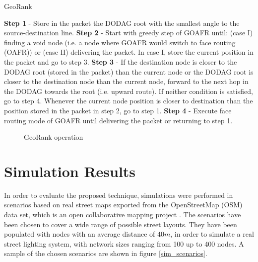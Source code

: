 \documentclass[authoryear,preprint,review,12pt]{elsarticle}
\begin{document}
\small
\begin{algorithm}
\begin{algorithmic}
\caption{GeoRank}
\label{alg}
\small
\STATE \textbf{Step 1} - Store in the packet the DODAG root with the smallest angle to the source-destination
line. 
\STATE \textbf{Step 2} - Start with greedy step of GOAFR until: (case I) finding a void node (i.e. a node where GOAFR would switch to face  routing (OAFR)) or (case II) delivering the packet. In case I, store the current position in the packet and go to step 3.
\STATE \textbf{Step 3} - If the destination node is closer to the DODAG root (stored in the packet) than the current node or the DODAG root is closer to the destination node than the current node, forward to the next hop in the DODAG towards the root (i.e. upward route). If neither condition is satisfied, go to step 4. Whenever the current node position is closer to destination than the position stored in the packet in step 2, go to step 1.
\STATE \textbf{Step 4} -  Execute face routing mode of GOAFR until delivering the packet or returning to step 1.
\small
\end{algorithmic}
\end{algorithm}
\normalsize
\begin{figure}
\centering
{}
\caption{GeoRank operation}
\label{state_machine}
\end{figure}

\section{Simulation Results}
\label{secSimulation}

In order to evaluate the proposed technique, simulations were performed in scenarios based on real street maps exported from the OpenStreetMap (OSM) data set, which is an open collaborative mapping project \citep{OSM}. The scenarios have been chosen to cover a wide range of possible street layouts. They have been populated with nodes with an average distance of $40m$, in order to simulate a real street lighting system, with network sizes ranging from 100 up to 400 nodes. A sample of the chosen scenarios are shown in figure \ref{sim_scenarios}. 
\end{document}
